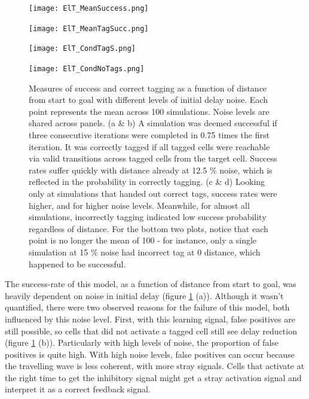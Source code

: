 \documentclass{article}
\begin{document}
    \begin{figure}[H]
        \begin{minipage}[t]{0.5\linewidth}
            \subcaption{}
            \texttt{[image: ElT\_MeanSuccess.png]}
        \end{minipage}
        \begin{minipage}[t]{0.5\linewidth}
            \subcaption{}
            \texttt{[image: ElT\_MeanTagSucc.png]}
        \end{minipage}
        \begin{minipage}[t]{0.5\linewidth}
            \subcaption{}
            \texttt{[image: ElT\_CondTagS.png]}
        \end{minipage}
        \begin{minipage}[t]{0.5\linewidth}
            \subcaption{}
            \texttt{[image: ElT\_CondNoTags.png]}
        \end{minipage}
        \caption{Measures of success and correct tagging as a function of distance from start to goal with different levels of initial delay noise. Each point represents the mean across 100 simulations. Noise levels are shared across panels. (a \& b) A simulation was deemed successful if three consecutive iterations were completed in 0.75 times the first iteration. It was correctly tagged if all tagged cells were reachable via valid transitions across tagged cells from the target cell. Success rates suffer quickly with distance already at 12.5 \% noise, which is reflected in the probability in correctly tagging. (c \& d) Looking only at simulations that handed out correct tags, success rates were higher, and for higher noise levels. Meanwhile, for almost all simulations, incorrectly tagging indicated low success probability regardless of distance. For the bottom two plots, notice that each point is no longer the mean of 100 - for instance, only a single simulation at 15 \% noise had incorrect tag at 0 distance, which happened to be successful.}
        \label{success_rates_plot}
    \end{figure}

    The success-rate of this model, as a function of distance from start to goal, was heavily dependent on noise in initial delay (figure \ref{success_rates_plot} (a)). Although it wasn't quantified, there were two observed reasons for the failure of this model, both influenced by this noise level. First, with this learning signal, false positives are still possible, so cells that did not activate a tagged cell still see delay reduction (figure \ref{success_rates_plot} (b)). Particularly with high levels of noise, the proportion of false positives is quite high. With high noise levels, false positives can occur because the travelling wave is less coherent, with more stray signals. Cells that activate at the right time to get the inhibitory signal might get a stray activation signal and interpret it as a correct feedback signal.
\end{document}
